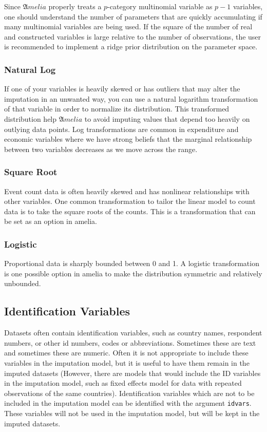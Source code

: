 \documentclass[12pt,titlepage]{article}
\begin{document}
Since ${\mathfrak Amelia}$ properly treats a $ p$-category multinomial variable as $ p-1$ variables, one should understand the number of parameters that are quickly accumulating if many multinomial variables are being used. If the square of the number of real and constructed variables is large relative to the number of observations, the user is recommended to implement a ridge prior distribution on the parameter space.

\subsubsection{Natural Log}
\label{sec:log}
If one of your variables is heavily skewed or has outliers that may alter the imputation in an unwanted way, you can use a natural logarithm transformation of that variable in order to normalize its distribution.  This transformed distribution help ${\mathfrak Amelia}$ to avoid imputing values that depend too heavily on outlying data points.  Log transformations are common in expenditure and economic variables where we have strong beliefs that the marginal relationship between two variables decreases as we move across the range.

\subsubsection{Square Root}
\label{sec:sqrt}
Event count data is often heavily skewed and has nonlinear relationships with other variables.  One common transformation to tailor the linear model to count data is to take the square roots of the counts.  This is a transformation that can be set as an option in amelia.
 
\subsubsection{Logistic}
\label{sec:lgstc}
Proportional data is sharply bounded between 0 and 1.  A logistic transformation is one possible option in amelia to make the distribution symmetric and relatively unbounded.

\subsection{Identification Variables}
\label{sec:idvars}
Datasets often contain identification variables, such as country names, respondent numbers, or other id numbers, codes or abbreviations.  Sometimes these are text and sometimes these are numeric.  Often it is not appropriate to include these variables in the imputation model, but it is useful to have them remain in the imputed datasets (However, there are models that would include the ID variables in the imputation model, such as fixed effects model for data with repeated observations of the same countries).  Identification variables which are not to be included in the imputation model can be identified with the argument \texttt{idvars}.  These variables will not be used in the imputation model, but will be kept in the imputed datasets.
\end{document}
